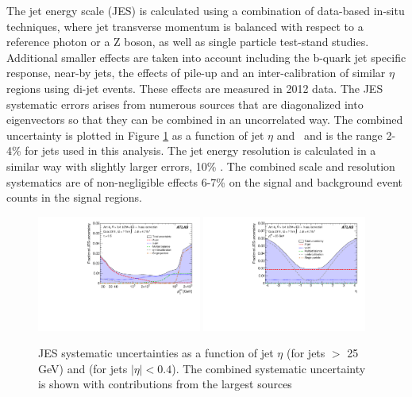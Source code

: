 The jet energy scale (JES) is calculated using a combination of data-based in-situ techniques, where jet transverse momentum is balanced with respect to a reference photon or a Z boson, as well as single particle test-stand studies\cite{Aad:2014bia}. Additional smaller effects are taken into account including the b-quark jet specific response, near-by jets, the effects of pile-up and an inter-calibration of similar $\eta$ regions using di-jet events. These effects are measured in 2012 data. The JES systematic errors arises from numerous sources that are diagonalized into eigenvectors so that they can be combined in an uncorrelated way. The combined uncertainty is plotted in Figure \ref{figure:systematics_jes} as a function of jet $\eta$ and \pt\ and is the range 2-4\% for jets used in this analysis. The jet energy resolution is calculated in a similar way with slightly larger errors, 10\% \cite{Aad:2012ag}. The combined scale and resolution systematics are of non-negligible effects 6-7\% on the signal and background event counts in the signal regions.  


\begin{figure}[htbp]
\begin{center}
\includegraphics[width=0.48\textwidth]{figs/systematics/fig_61a}
\includegraphics[width=0.48\textwidth]{figs/systematics/fig_61c}
\caption{JES systematic uncertainties as a function of jet $\eta$ (for jets \pt $>$ 25 GeV) and \pt (for jets $|\eta|<0.4$). The combined systematic uncertainty is shown with contributions from the largest sources}
\label{figure:systematics_jes}
\end{center}
\end{figure}


